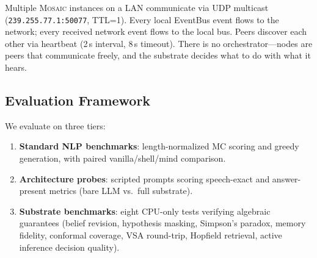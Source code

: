 Multiple \textsc{Mosaic} instances on a LAN communicate via UDP multicast
(\texttt{239.255.77.1:50077}, TTL=1).  Every local EventBus event flows to the
network; every received network event flows to the local bus.  Peers discover
each other via heartbeat (2\,s interval, 8\,s timeout).  There is no
orchestrator---nodes are peers that communicate freely, and the substrate
decides what to do with what it hears.

\subsection{Evaluation Framework}

We evaluate on three tiers:
\begin{enumerate}[nosep]
  \item \textbf{Standard NLP benchmarks}: length-normalized MC scoring and
    greedy generation, with paired vanilla/shell/mind comparison.
  \item \textbf{Architecture probes}: scripted prompts scoring speech-exact and
    answer-present metrics (bare LLM vs.\ full substrate).
  \item \textbf{Substrate benchmarks}: eight CPU-only tests verifying algebraic
    guarantees (belief revision, hypothesis masking, Simpson's paradox, memory
    fidelity, conformal coverage, VSA round-trip, Hopfield retrieval, active
    inference decision quality).
\end{enumerate}
